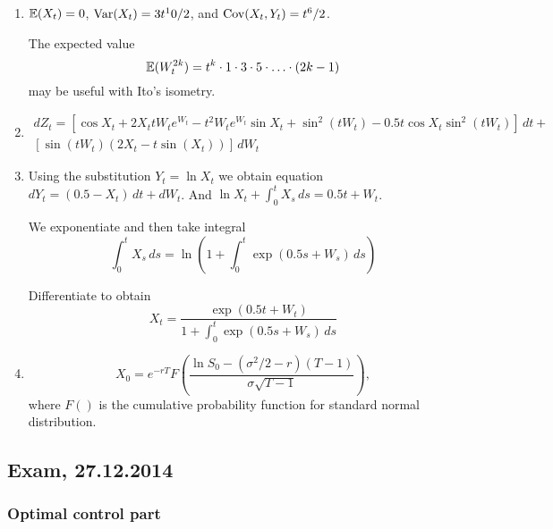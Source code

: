 \documentclass[12pt, a4paper]{article}
\begin{document}
\begin{enumerate}
\item $\mathbb{E}(X_t)=0$, $\operatorname{Var}(X_t)=3t^10/2$, and $\operatorname{Cov}(X_t,Y_t)=t^6/2$.

The expected value
\[
\mathbb{E}(W_t^{2k})=t^k\cdot 1\cdot 3 \cdot 5 \cdot \ldots \cdot (2k-1)
\]
may be useful with Ito's isometry.

\item
\begin{multline}
dZ_t=[\cos X_t+2X_t t W_t e^{W_t}-t^2W_te^{W_t}\sin X_t + \sin^2(tW_t) - 0.5t\cos X_t \sin^2(tW_t)]\,dt + \\
[\sin(tW_t)(2X_t-t\sin(X_t))]\, dW_t
\end{multline}
\item Using the substitution $Y_t=\ln X_t$ we obtain equation $dY_t=(0.5-X_t) \, dt + dW_t$. And $\ln X_t + \int_0^t X_s \, ds = 0.5t+W_t$.

We exponentiate and then take integral
\[
\int_0^t X_s \, ds=\ln \left( 1 + \int_0^t \exp(0.5s+W_s) \, ds \right)
\]

Differentiate to obtain
\[
X_t=\frac{\exp(0.5t+W_t)}{1+\int_0^t \exp(0.5s+W_s) \, ds}
\]

\item
\[
X_0=e^{-rT}F\left(  \frac{\ln S_0 - (\sigma^2/2-r)(T-1)}{\sigma \sqrt{T-1}} \right),
\]
where $F()$ is the cumulative probability function for standard normal distribution.

\end{enumerate}

\subsection{Exam, 27.12.2014}

\subsubsection*{Optimal control part}
\end{document}

